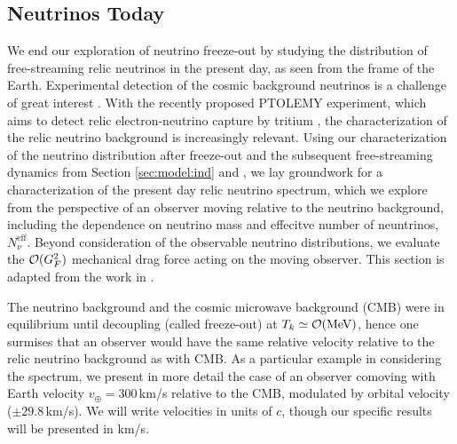 \subsection{Neutrinos Today}\label{ch:nu:today}
We end our exploration of neutrino freeze-out by studying the distribution of free-streaming relic neutrinos in the present day, as seen from the frame of the Earth. Experimental detection of the cosmic background neutrinos is a challenge of great interest \cite{Stodolsky:1974aq,Cabibbo:1982bb,Shvartsman,Langacker:1982ih,Smith:1983jj,Ferreras:1995wf,Hagmann:1999kf,Duda:2001hd,Gelmini:2004hg,Ringwald:2009bg,Liao:2012wb,Hedman:2013hha}. With the  recently proposed PTOLEMY experiment, which aims to detect relic  electron-neutrino capture by tritium \cite{Betts:2013uya}, the characterization of the relic neutrino background is increasingly relevant.  Using our  characterization of the neutrino distribution after freeze-out and the subsequent free-streaming dynamics from Section  \ref{sec:model:ind} and \cite{Birrell:2012gg}, we lay groundwork for a characterization of the present day relic neutrino spectrum, which we explore  from the  perspective of an observer moving relative to the neutrino background, including the dependence on neutrino mass and effecitve number of neuntrinos, $N_\nu^{\mathrm{eff}}$. Beyond consideration of the observable neutrino distributions, we evaluate the ${\cal O}(G_F^2)$ mechanical drag force acting on the moving observer. This section is adapted from the work in \cite{Birrell:2014qna}.

The neutrino background and the cosmic microwave background (CMB) were in equilibrium until decoupling (called freeze-out) at $T_k\simeq {\cal O}{\rm (MeV)}$, hence one surmises that an observer would have the same relative velocity relative to the relic neutrino background  as with CMB. As a particular example in considering the spectrum, we present in more detail the case of an observer comoving with  Earth velocity $v_\oplus=300$\,km/s relative to the CMB,  modulated by orbital velocity ($\pm29.8$\,km/s).  We will write velocities in units of $c$, though our specific results will be presented in km/s.

